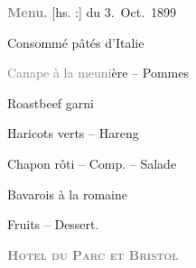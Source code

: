 \pstart
           \centering{}\textcolor{gray}{\textbf{Menu.}}{ }{[}hs. :{]} du 3. Oct. 1899\pend
           
\pstart
           \centering{}Consommé pâtés d’Italie\pend
           
\pstart
           \centering{}\textcolor{gray}{Canape à la meuni}ère – Pommes\pend
           
\pstart
           \centering{}Roastbeef garni\pend
           
\pstart
           \centering{}Haricots verts – Hareng\pend
           
\pstart
           \centering{}Chapon rôti – Comp. – Salade\pend
           
\pstart
           \centering{}Bavarois à la romaine\pend
           
\pstart
           \centering{}Fruits – Dessert.\pend
           
\pstart
           \textcolor{gray}{\textbf{\textsc{Hotel du Parc et Bristol}}}\pend
           \endnumbering{}  
      